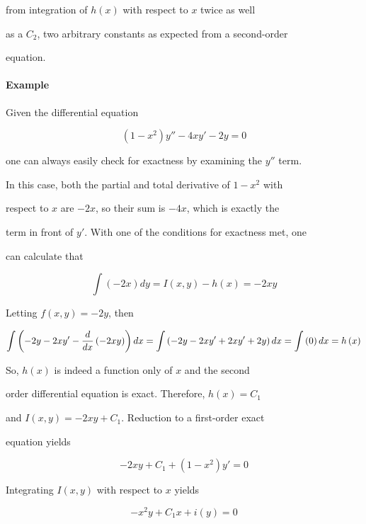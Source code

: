 from integration of $h\left(x\right)$ with respect to $x$ twice as well

as a $C_2$, two arbitrary constants as expected from a second-order

equation.



\paragraph{Example}



Given the differential equation



$$\left(1-x^2\right)y''-4xy'-2y=0$$



one can always easily check for exactness by examining the $y''$ term.

In this case, both the partial and total derivative of $1-x^2$ with

respect to $x$ are $-2x$, so their sum is $-4x$, which is exactly the

term in front of $y'$. With one of the conditions for exactness met, one

can calculate that



$$\int \left(-2x\right)dy=I\left(x,y\right)-h\left(x\right)=-2xy$$



Letting $f\left(x,y\right)=-2y$, then



$$\int \left(-2y-2xy'-{d \over dx}\left(-2xy \right)\right)dx=\int \left(-2y-2xy'+2xy'+2y\right)dx=\int \left(0\right)dx=h\left(x\right)$$



So, $h\left(x\right)$ is indeed a function only of $x$ and the second

order differential equation is exact. Therefore, $h\left(x\right)=C_1$

and $I\left(x,y\right)=-2xy+C_1$. Reduction to a first-order exact

equation yields



$$-2xy+C_1+\left(1-x^2\right)y'=0$$



Integrating $I\left(x,y\right)$ with respect to $x$ yields



$$-x^2y+C_1x+i\left(y\right)=0$$



